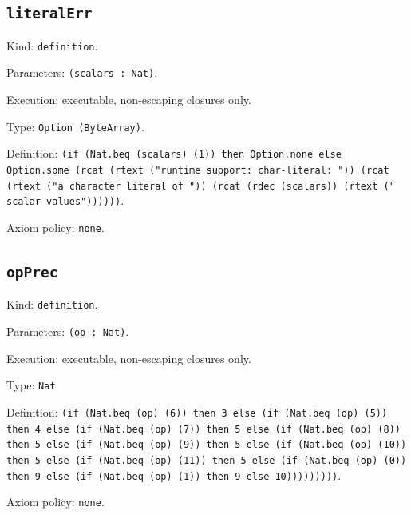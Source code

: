 \documentclass[11pt]{article}
\begin{document}
\subsection*{\texttt{literalErr}}
\noindent Kind: \texttt{definition}.\par
\noindent Parameters: \texttt{(scalars : Nat)}.\par
\noindent Execution: executable, non-escaping closures only.\par
\noindent Type: \texttt{Option (ByteArray)}.\par
\noindent Definition: \texttt{(if (Nat.beq (scalars) (1)) then Option.none else Option.some (rcat (rtext ("runtime support: char-literal: ")) (rcat (rtext ("a character literal of ")) (rcat (rdec (scalars)) (rtext (" scalar values"))))))}.\par
\noindent Axiom policy: \texttt{none}.\par
\subsection*{\texttt{opPrec}}
\noindent Kind: \texttt{definition}.\par
\noindent Parameters: \texttt{(op : Nat)}.\par
\noindent Execution: executable, non-escaping closures only.\par
\noindent Type: \texttt{Nat}.\par
\noindent Definition: \texttt{(if (Nat.beq (op) (6)) then 3 else (if (Nat.beq (op) (5)) then 4 else (if (Nat.beq (op) (7)) then 5 else (if (Nat.beq (op) (8)) then 5 else (if (Nat.beq (op) (9)) then 5 else (if (Nat.beq (op) (10)) then 5 else (if (Nat.beq (op) (11)) then 5 else (if (Nat.beq (op) (0)) then 9 else (if (Nat.beq (op) (1)) then 9 else 10)))))))))}.\par
\noindent Axiom policy: \texttt{none}.\par
\end{document}
